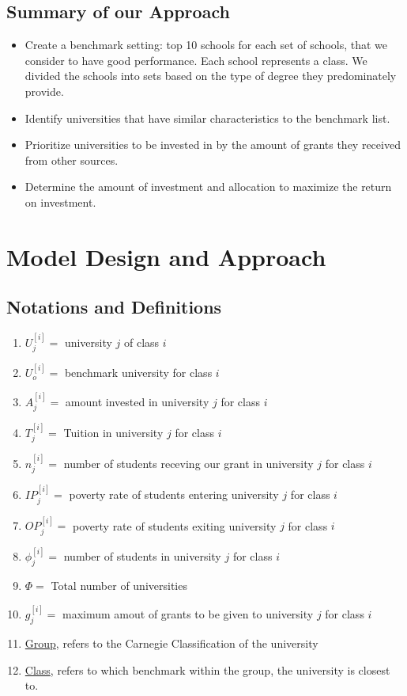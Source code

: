 \documentclass[12pt]{scrartcl}
\begin{document}
	\subsection{Summary of our Approach}
		\begin{itemize}
		\item Create a benchmark setting: top 10 schools for each set of schools, that we consider to have good performance. Each school represents a class. We divided the schools into sets based on the type of degree they predominately provide.  
		\item Identify universities that have similar characteristics to the benchmark list. 
		\item Prioritize universities to be invested in by the amount of grants they received from other sources.
		\item Determine the amount of investment and allocation to maximize the return on investment. 
		\end{itemize}
				
\section{Model Design and Approach}
	\subsection{Notations and Definitions}
	\begin{enumerate}
		\item $U_j^{[i]} = $ university $j$ of class $i$
		\item $U_o^{[i]} = $ benchmark university for class $i$
		\item $A_j^{[i]} = $ amount invested in university $j$ for class $i$
		\item $T_j^{[i]} = $ Tuition in university $j$ for class $i$
		\item $n_j^{[i]} = $ number of students receving our grant in university $j$ for class $i$
		\item $IP_j^{[i]} = $ poverty rate of students entering university $j$ for class $i$
		\item $OP_j^{[i]} = $ poverty rate of students exiting university $j$ for class $i$
		\item $\phi_j^{[i]} = $ number of students in university $j$ for class $i$
		\item $\Phi = $ Total number of universities
		\item $g_j^{[i]} = $ maximum amout of grants to be given to university $j$ for class $i$
		\item \underline{Group}, refers to the Carnegie Classification of the university
		\item \underline{Class}, refers to which benchmark within the group, the university is closest to.
	\end{enumerate}
	
\end{document}
